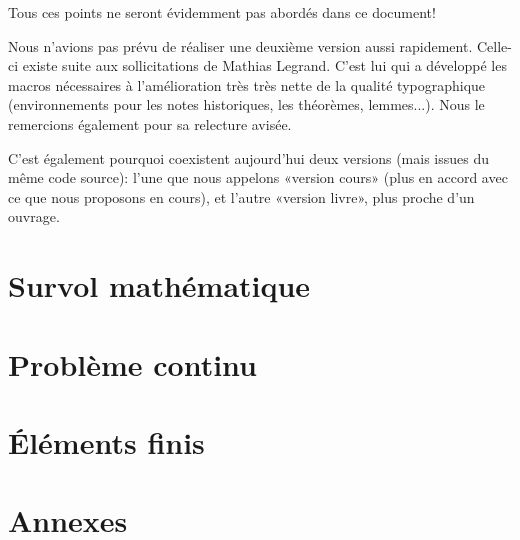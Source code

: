 \documentclass[11pt,pdflatex]{book}
\begin{document}
\medskip
Tous ces points ne seront évidemment pas abordés dans ce document!
\vfill
\noindent
{}

Nous n'avions pas prévu de réaliser une deuxième version aussi rapidement.
Celle-ci existe suite aux sollicitations de Mathias Legrand. C'est lui  qui a développé les macros nécessaires à l'amélioration très très nette de la qualité typographique (environnements pour les notes historiques, les théorèmes, lemmes...). Nous le remercions également pour sa relecture avisée.

C'est également pourquoi coexistent aujourd'hui deux versions (mais issues du même code source): l'une que nous appelons «version cours» (plus en accord avec ce que nous proposons en cours), et l'autre «version livre», plus proche d'un ouvrage.


\cleardoublepage
\tableofcontents


 \part{Survol mathématique}
 
 
 
 
 
 

 \part{Problème continu}
 
 
 
 

 \part{Éléments finis}
 
 
 
 
 
 
 
 
 
 
 

 \appendix
 \part{Annexes}
 
 
 
 
 
\end{document}
